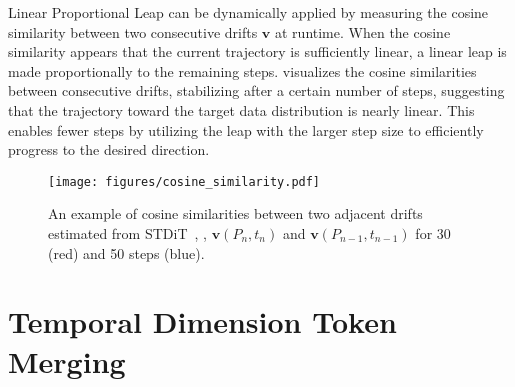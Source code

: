 
Linear Proportional Leap can be dynamically applied by measuring the cosine similarity between two consecutive drifts $\boldsymbol{v}$ at runtime. When the cosine similarity appears that the current trajectory is sufficiently linear, a linear leap is made proportionally to the remaining steps.  visualizes the cosine similarities between consecutive drifts, stabilizing after a certain number of steps, suggesting that the trajectory toward the target data distribution is nearly linear. 
This enables fewer steps by utilizing the leap with the larger step size to efficiently progress to the desired direction.

\begin{figure} [!t]
  \centering
  \begin{minipage}[c]{0.51\columnwidth}
    \centering    
    \texttt{[image: figures/cosine\_similarity.pdf]}
  \end{minipage}%
  \begin{minipage}[c]{0.47\columnwidth}
  \caption{An example of cosine similarities between two adjacent drifts estimated from STDiT~\cite{opensora}, \ie, $\boldsymbol{v}(P_{n},t_{n})$ and $\boldsymbol{v}(P_{n-1},t_{n-1})$ for 30 (red) and 50 steps (blue).} 
    \label{fig:cos_siml}
  \end{minipage}
\end{figure}

\section{Temporal Dimension Token Merging}
\label{sec:ours2}

